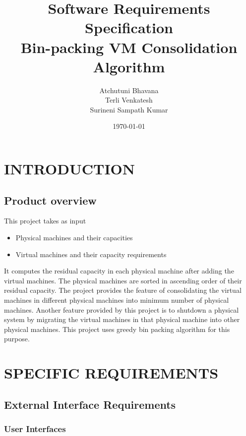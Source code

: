 \documentclass[a4paper,11pt]{article}
\title{Software Requirements Specification \\ Bin-packing VM Consolidation Algorithm}
\author{Atchutuni Bhavana \\ Terli Venkatesh \\ Surineni Sampath Kumar}
\date{\today}
\begin{document}
	\maketitle
	 \pagebreak 
	 \tableofcontents
	 \pagebreak 

	\section{INTRODUCTION}
		\subsection{Product overview}
		This project takes as  input 
		\begin{itemize}
		  \item Physical machines and their capacities
		  \item Virtual machines and their capacity requirements
		  
		\end{itemize} 
		It computes the residual capacity in each physical machine after adding the 
		virtual machines. The physical machines are sorted in ascending order of their residual capacity. 
		The project provides the feature of consolidating the virtual machines in different physical machines into 
		minimum number of physical machines. Another feature provided by this project is to shutdown a physical system
		by migrating the virtual machines in that physical machine into other physical machines. This project uses
		greedy bin packing algorithm for this purpose. \section{SPECIFIC REQUIREMENTS}
		\subsection{External Interface Requirements}
			\subsubsection{User Interfaces}
			
\end{document}
